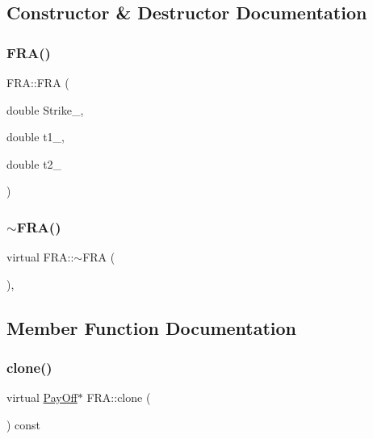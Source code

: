 \subsection{Constructor \& Destructor Documentation}
\hypertarget{classFRA_a1a79b1ee95936f7daf8e07b6aceec75a}{}\label{classFRA_a1a79b1ee95936f7daf8e07b6aceec75a} 
\subsubsection{\texorpdfstring{F\+R\+A()}{FRA()}}
{\footnotesize\ttfamily F\+R\+A\+::\+F\+RA (\begin{DoxyParamCaption}\item[{double}]{Strike\+\_\+,  }\item[{double}]{t1\+\_\+,  }\item[{double}]{t2\+\_\+ }\end{DoxyParamCaption})}

\hypertarget{classFRA_a11650948142f6b90aeef7816d8aa65ac}{}\label{classFRA_a11650948142f6b90aeef7816d8aa65ac} 
\subsubsection{\texorpdfstring{$\sim$\+F\+R\+A()}{~FRA()}}
{\footnotesize\ttfamily virtual F\+R\+A\+::$\sim$\+F\+RA (\begin{DoxyParamCaption}{ }\end{DoxyParamCaption})\hspace{0.3cm}{\ttfamily [inline]}, {\ttfamily [virtual]}}



\subsection{Member Function Documentation}
\hypertarget{classFRA_a0f2a7b7852bbd747b5673bd9016f5cf0}{}\label{classFRA_a0f2a7b7852bbd747b5673bd9016f5cf0} 
\subsubsection{\texorpdfstring{clone()}{clone()}}
{\footnotesize\ttfamily virtual \hyperlink{classPayOff}{Pay\+Off}$\ast$ F\+R\+A\+::clone (\begin{DoxyParamCaption}{ }\end{DoxyParamCaption}) const\hspace{0.3cm}{\ttfamily [virtual]}}



